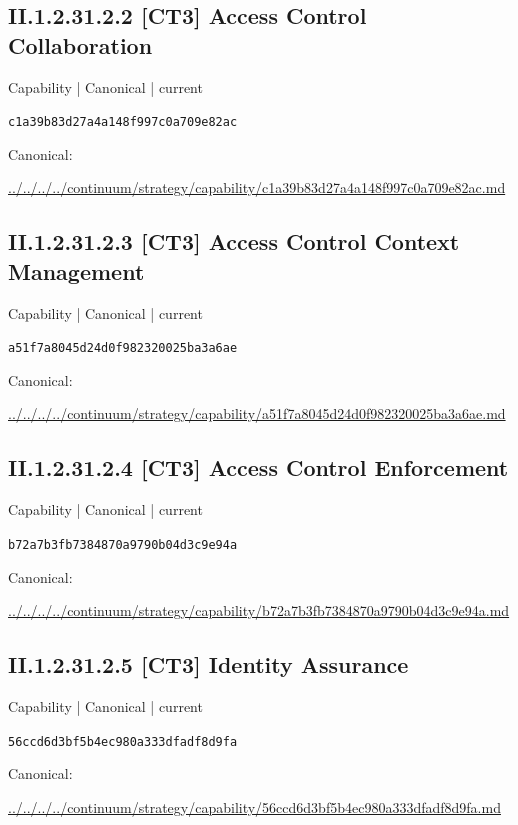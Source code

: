\documentclass[10pt,a4paper]{article}
\begin{document}
\subsection*{II.1.2.31.2.2 [CT3] Access Control Collaboration}
{\small Capability | Canonical | current}\par
\texttt{c1a39b83d27a4a148f997c0a709e82ac}\par
Canonical: \par
{\footnotesize\url{../../../../continuum/strategy/capability/c1a39b83d27a4a148f997c0a709e82ac.md}}\par
\subsection*{II.1.2.31.2.3 [CT3] Access Control Context Management}
{\small Capability | Canonical | current}\par
\texttt{a51f7a8045d24d0f982320025ba3a6ae}\par
Canonical: \par
{\footnotesize\url{../../../../continuum/strategy/capability/a51f7a8045d24d0f982320025ba3a6ae.md}}\par
\subsection*{II.1.2.31.2.4 [CT3] Access Control Enforcement}
{\small Capability | Canonical | current}\par
\texttt{b72a7b3fb7384870a9790b04d3c9e94a}\par
Canonical: \par
{\footnotesize\url{../../../../continuum/strategy/capability/b72a7b3fb7384870a9790b04d3c9e94a.md}}\par
\subsection*{II.1.2.31.2.5 [CT3] Identity Assurance}
{\small Capability | Canonical | current}\par
\texttt{56ccd6d3bf5b4ec980a333dfadf8d9fa}\par
Canonical: \par
{\footnotesize\url{../../../../continuum/strategy/capability/56ccd6d3bf5b4ec980a333dfadf8d9fa.md}}\par
\end{document}
